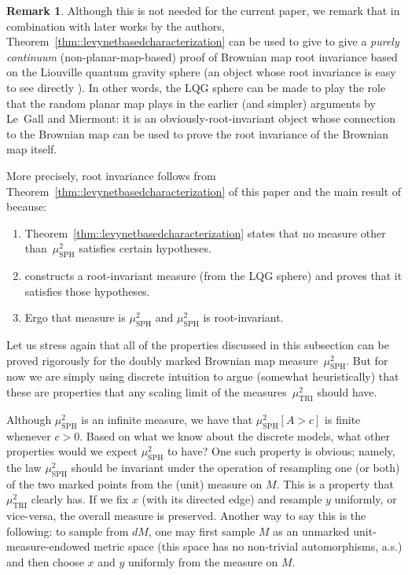 \documentclass[JEP,XML,SOM,Unicode]{cedram}
\theoremstyle{plain}
\numberwithin{theorem}{section}
\theoremstyle{definition}
\newtheorem{remark}[theorem]{Remark}
\newcommand{\mustwo}{\mu_{\mathrm{SPH}}^2}
\begin{document}
\begin{remark}
\label{rem::alternaterootinvarianceproof}
Although this is not needed for the current paper, we remark that in combination with later works by the authors, Theorem~\ref{thm::levynetbasedcharacterization} can be used to give to give a \emph{purely continuum} (non-planar-map-based) proof of Brownian map root invariance based on the Liouville quantum gravity sphere (an object whose root invariance is easy to see directly \cite{matingtrees}).
In other words, the LQG sphere can be made to play the role that the random planar map plays in the earlier (and simpler) arguments by Le~Gall and Miermont: it is an obviously-root-invariant object whose connection to the Brownian map can be used to prove the root invariance of the Brownian map itself.

More precisely, root invariance follows from Theorem~\ref{thm::levynetbasedcharacterization} of this paper and the main result of \cite{qle_continuity} because:
\begin{enumerate}
\item Theorem~\ref{thm::levynetbasedcharacterization} states that no measure other than~$\mustwo$ satisfies certain hypotheses.
\item \cite{qle_continuity} constructs a root-invariant measure (from the LQG sphere) and proves that it satisfies those hypotheses.
\item Ergo that measure is $\mustwo$ and $\mustwo$ is root-invariant.
\end{enumerate}

\end{remark}

Let us stress again that all of the properties discussed in this subsection can be proved rigorously for the doubly marked Brownian map measure~$\mustwo$. But for now we are simply using discrete intuition to argue (somewhat heuristically) that these are properties that any scaling limit of the measures~$\mu^2_{\mathrm{TRI}}$ should have.

Although $\mustwo$ is an infinite measure, we have that $\mustwo[ A > c ]$ is finite whenever $c > 0$. Based on what we know about the discrete models, what other properties would we expect $\mustwo$ to have? One such property is obvious; namely, the law $\mustwo$ should be invariant under the operation of resampling one (or both) of the two marked points from the (unit) measure on $M$. This is a property that $\mu^2_{\mathrm{TRI}}$ clearly has. If we fix $x$ (with its directed edge) and resample $y$ uniformly, or vice-versa, the overall measure is preserved. Another way to say this is the following: to sample from $dM$, one may first sample $M$ as an unmarked unit-measure-endowed metric space (this space has no non-trivial automorphisms, a.s.) and then choose $x$ and $y$ uniformly from the measure on $M$.
\end{document}
